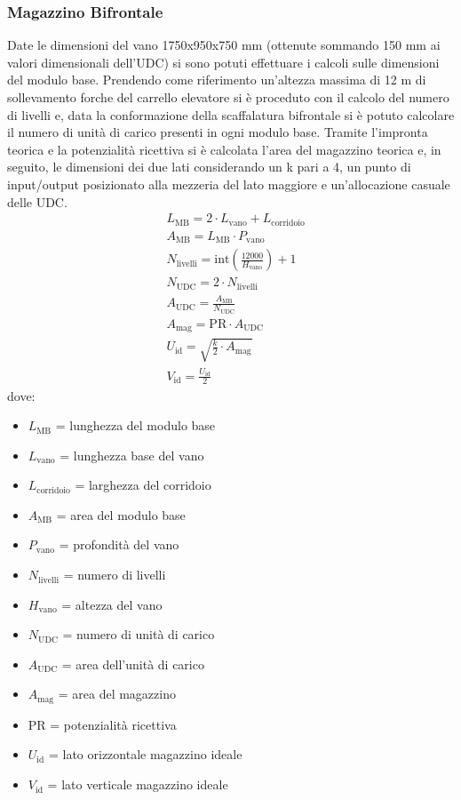 \documentclass[11pt]{article}
\begin{document}
\subsubsection{Magazzino Bifrontale}
Date le dimensioni del vano 1750x950x750 mm (ottenute sommando 150 mm ai valori dimensionali dell'UDC) si sono potuti effettuare i calcoli sulle dimensioni del modulo base.
Prendendo come riferimento un'altezza massima di 12 m di sollevamento forche del carrello elevatore si è proceduto con il calcolo del numero di livelli e, data la conformazione della scaffalatura bifrontale si è potuto calcolare il numero di unità di carico presenti in ogni modulo base. Tramite l'impronta teorica e la potenzialità ricettiva si è calcolata l'area del magazzino teorica e, in seguito, le dimensioni dei due lati considerando un k pari a 4, un punto di input/output posizionato alla mezzeria del lato maggiore e un'allocazione casuale delle UDC.
\begin{align}
    & L_\text{MB} = 2 \cdot L_\text{vano} + L_\text{corridoio} \\
    & A_\text{MB} = L_\text{MB} \cdot P_\text{vano} \\
    & N_\text{livelli} = \text{int}\left(\frac{12000}{H_\text{vano}}\right) + 1 \\
    & N_\text{UDC} = 2 \cdot N_\text{livelli} \\
    & A_\text{UDC} = \frac{A_\text{MB}}{N_\text{UDC}} \\
    & A_\text{mag} = \text{PR} \cdot A_\text{UDC} \\
    & U_\text{id} = \sqrt{\frac{k}{2} \cdot A_\text{mag}} \\
    & V_\text{id} = \frac{U_\text{id}}{2}
\end{align}
dove:
\begin{itemize}
    \item $L_\text{MB}$ = lunghezza del modulo base
    \item $L_\text{vano}$ = lunghezza base del vano
    \item $L_\text{corridoio}$ = larghezza del corridoio
    \item $A_\text{MB}$ = area del modulo base
    \item $P_\text{vano}$ = profondità del vano
    \item $N_\text{livelli}$ = numero di livelli
    \item $H_\text{vano}$ = altezza del vano
    \item $N_\text{UDC}$ = numero di unità di carico
    \item $A_\text{UDC}$ = area dell'unità di carico
    \item $A_\text{mag}$ = area del magazzino
    \item $\text{PR}$ = potenzialità ricettiva
    \item $U_\text{id}$ = lato orizzontale magazzino ideale
    \item $V_\text{id}$ = lato verticale magazzino ideale
\end{itemize}
\end{document}
